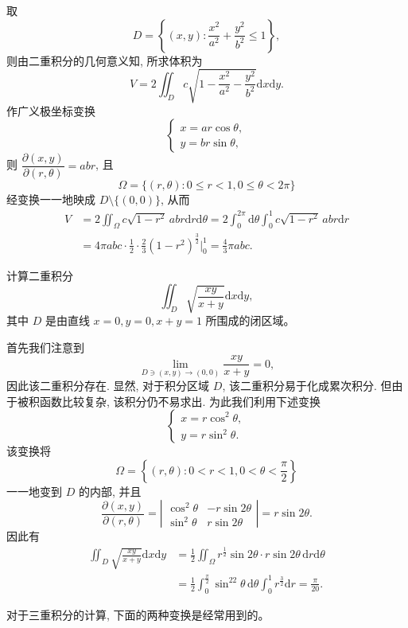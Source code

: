 \documentclass[UTF8,12pt,a4paper,fontset=fandol]{ctexart}
\begin{document}
\begin{solve}\quad 取
\[
  D=\left\{(x,y):\frac{x^2}{a^2}+\frac{y^2}{b^2}\leqslant1\right\},
\]
则由二重积分的几何意义知, 所求体积为
\[
  V=2\iint_D c\sqrt{1-\frac{x^2}{a^2}-\frac{y^2}{b^2}}\mathrm dx\mathrm dy.
\]
作广义极坐标变换
\[
  \begin{cases}
    x=ar\cos\theta,\\
    y=br\sin\theta,
  \end{cases}
\]
则 $\dfrac{\partial(x,y)}{\partial(r,\theta)}=abr$, 且
\[
  \Omega=\{(r,\theta):0\leqslant r<1,0\leqslant\theta<2\pi\}
\]
经变换一一地映成 $D\setminus\{(0,0)\}$, 从而
\[
\begin{aligned}
  V&=2\iint_\Omega c\sqrt{1-r^2}\,abr\mathrm dr\mathrm d\theta
  =2\int_0^{2\pi}\mathrm d\theta\int_0^1 c\sqrt{1-r^2}\,abr\mathrm dr\\
  &=4\pi abc\cdot\frac12\cdot\frac23(1-r^2)^{\frac32}\Big|_0^1
  =\frac43\pi abc.
\end{aligned}
\]

\end{solve}
\begin{example}\label{course-example-15-4-5}\quad 计算二重积分
\[
  \iint_D\sqrt{\frac{xy}{x+y}}\mathrm dx\mathrm dy,
\]
其中 $D$ 是由直线 $x=0,y=0,x+y=1$ 所围成的闭区域。

\end{example}
\begin{solve}\quad 首先我们注意到
\[
  \lim_{D\ni(x,y)\to(0,0)}\frac{xy}{x+y}=0,
\]
因此该二重积分存在. 显然, 对于积分区域 $D$, 该二重积分易于化成累次积分. 但由于被积函数比较复杂, 该积分仍不易求出. 为此我们利用下述变换
\[
  \begin{cases}
    x=r\cos^2\theta,\\
    y=r\sin^2\theta.
  \end{cases}
\]
该变换将
\[
  \Omega=\left\{(r,\theta):0<r<1,0<\theta<\frac\pi2\right\}
\]
一一地变到 $D$ 的内部, 并且
\[
  \frac{\partial(x,y)}{\partial(r,\theta)}
  =\left|\begin{matrix}
    \cos^2\theta&-r\sin2\theta\\
    \sin^2\theta&r\sin2\theta
  \end{matrix}\right|
  =r\sin2\theta.
\]
因此有
\[
\begin{aligned}
  \iint_D\sqrt{\frac{xy}{x+y}}\mathrm dx\mathrm dy
  &=\frac12\iint_\Omega r^{\frac12}\sin2\theta\cdot r\sin2\theta\,\mathrm dr\mathrm d\theta\\
  &=\frac12\int_0^{\frac\pi2}\sin^22\theta\,\mathrm d\theta\int_0^1 r^{\frac32}\mathrm dr
  =\frac\pi{20}.
\end{aligned}
\]

对于三重积分的计算, 下面的两种变换是经常用到的。

\end{solve}
\end{document}

